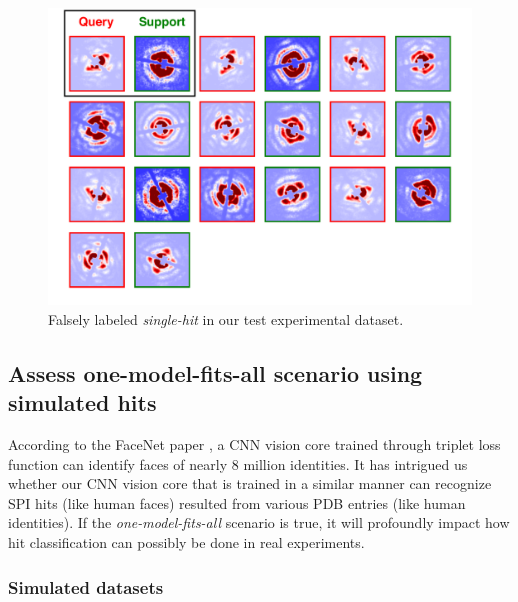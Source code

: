 \begin{figure}
\includegraphics[width=\textwidth,keepaspectratio]
{figures/false_label.single.real.pdf}
\caption{Falsely labeled \textit{single-hit} in our test experimental dataset.}
\label{fig : false single real}
\end{figure}


\subsection{Assess one-model-fits-all scenario using simulated hits}

According to the FaceNet paper \cite{schroffFaceNetUnifiedEmbedding2015}, a CNN
vision core trained through triplet loss function can identify faces of nearly 8
million identities.  It has intrigued us whether our CNN vision core that is
trained in a similar manner can recognize SPI hits (like human faces) resulted
from various PDB entries (like human identities).  If the
\textit{one-model-fits-all} scenario is true, it will profoundly impact how hit
classification can possibly be done in real experiments.  


\subsubsection{Simulated datasets}

